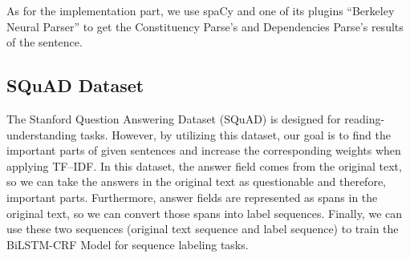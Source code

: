 %         
%         
%         


As for the implementation part, we use spaCy and one of its plugins ``Berkeley Neural Parser'' to get the Constituency Parse's and Dependencies Parse's results of the sentence.


\subsection{SQuAD Dataset} \label{subsec:squad}
The Stanford Question Answering Dataset (SQuAD)\cite{rajpurkar2016squad} is designed for reading-understanding tasks. However, by utilizing this dataset, our goal is to find the important parts of given sentences and increase the corresponding weights when applying TF--IDF. In this dataset, the answer field comes from the original text, so we can take the answers in the original text as questionable and therefore, important parts. Furthermore, answer fields are represented as spans in the original text, so we can convert those spans into label sequences. Finally, we can use these two sequences (original text sequence and label sequence) to train the BiLSTM-CRF Model for sequence labeling tasks.

